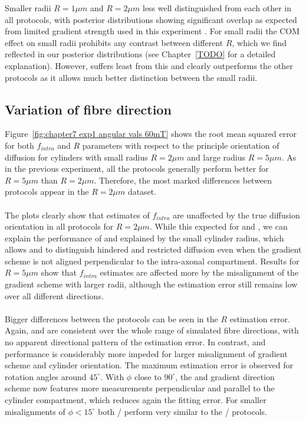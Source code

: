 Smaller radii $R=1\mu m$ and $R=2\mu m $ less well distinguished from each other in all protocols, with posterior distributions showing significant overlap as expected from limited gradient strength used in this experiment \citep{Alexander:2008,Alexander:2010,Siow:2012}. For small radii the \gls{COM} effect on small radii prohibits any contrast between different $R$, which we find reflected in our posterior distributions (see Chapter~\ref{TODO} for a detailed explanation). However, {\FD} suffers least from this and clearly outperforms the other protocols as it allows much better distinction between the small radii.


\subsection{Variation of fibre direction}
Figure~\ref{fig:chapter7 exp1 angular vals 60mT} shows the root mean squared error for both $f_{intra}$ and $R$ parameters with respect to the principle orientation of diffusion for cylinders with small radius $R=2\mu m$ and large radius $R=5\mu m$. As in the previous experiment, all the protocols generally perform better for $R=5\mu m$ than $R=2\mu m$. Therefore, the most marked differences between protocols appear in the $R=2\mu m$ dataset.
\paragraph{}
The plots clearly show that estimates of $f_{intra}$ are unaffected by the true diffusion orientation in all protocols for $R=2\mu m$. While this expected for {\OI} and {\SD}, we can explain the performance of {\FD} and {\DO} explained by the small cylinder radius, which allows {\FD} and {\OI} to distinguish hindered and restricted diffusion even when the gradient scheme is not aligned perpendicular to the intra-axonal compartment. Results for $R=5\mu m$ show that $f_{intra}$ estimates are affected more by the misalignment of the gradient scheme with larger radii, although the estimation error still remains low over all different directions.

\paragraph{}
Bigger differences between the protocols can be seen in the $R$ estimation error. Again, {\OI} and {\SD} are consistent over the whole range of simulated fibre directions, with no apparent directional pattern of the estimation error. In contrast, {\FD} and {\DO} performance is considerably more impeded for larger misalignment of gradient scheme and cylinder orientation. The maximum estimation error is observed for rotation angles around $45^\circ$. With $\phi$ close to $90^\circ$, the {\SF} and {\DO} gradient direction scheme now features more measurements perpendicular and parallel to the cylinder compartment, which reduces again the fitting error. For smaller misalignments of $\phi<15^\circ$ both {\FD}/{\DO} perform very similar to the {\OI}/{\SD} protocols.

